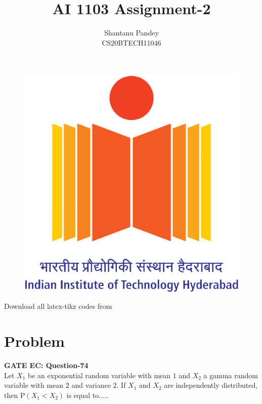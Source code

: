 \documentclass[twocolumn]{article}
\title{AI 1103 Assignment-2}
\author{Shantanu Pandey\\ CS20BTECH11046}
\date{}
\providecommand{\brak}[1]{\ensuremath{\left(#1\right)}}
\begin{document}
\newtheorem{theorem}{Theorem}[section]
\newtheorem{problem}{Problem}
\newtheorem{proposition}{Proposition}[section]
\newtheorem{lemma}{Lemma}[section]
\newtheorem{corollary}[theorem]{Corollary}
\newtheorem{example}{Example}[section]
\newtheorem{definition}[problem]{Definition}

\newcommand{\BEQA}{\begin{eqnarray}}
\newcommand{\EEQA}{\end{eqnarray}}
\newcommand{\define}{\stackrel{\triangle}{=}}
\newcommand{\Int}{\int\limits}
\maketitle
\noindent

\begin{figure} [h]
    \includegraphics[width = 0.6\columnwidth]{Logo.png}
\end{figure}
\vspace{0.3cm}

Download all latex-tikz codes from  

\vspace{0.3cm}  
    
   
\vspace{0.5cm}
\section*{Problem}
\textbf{GATE EC: Question-74 } \\
 Let $X_1$ be an exponential random variable with
mean $1$ and $X_2$ a gamma random variable with
mean $2$ and variance $2$. If $X_1$ and $X_2$ are
independently distributed, then $\mathrm{P}\brak{X_1 < X_2}$
is equal to.....
\end{document}
